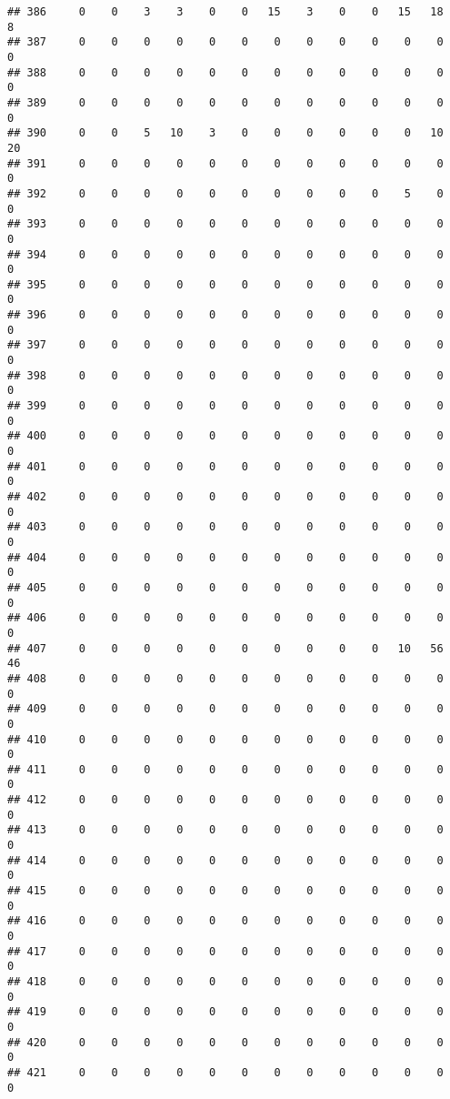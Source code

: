 \documentclass[]{article}
\begin{document}
\begin{verbatim}
## 386     0    0    3    3    0    0   15    3    0    0   15   18    8
## 387     0    0    0    0    0    0    0    0    0    0    0    0    0
## 388     0    0    0    0    0    0    0    0    0    0    0    0    0
## 389     0    0    0    0    0    0    0    0    0    0    0    0    0
## 390     0    0    5   10    3    0    0    0    0    0    0   10   20
## 391     0    0    0    0    0    0    0    0    0    0    0    0    0
## 392     0    0    0    0    0    0    0    0    0    0    5    0    0
## 393     0    0    0    0    0    0    0    0    0    0    0    0    0
## 394     0    0    0    0    0    0    0    0    0    0    0    0    0
## 395     0    0    0    0    0    0    0    0    0    0    0    0    0
## 396     0    0    0    0    0    0    0    0    0    0    0    0    0
## 397     0    0    0    0    0    0    0    0    0    0    0    0    0
## 398     0    0    0    0    0    0    0    0    0    0    0    0    0
## 399     0    0    0    0    0    0    0    0    0    0    0    0    0
## 400     0    0    0    0    0    0    0    0    0    0    0    0    0
## 401     0    0    0    0    0    0    0    0    0    0    0    0    0
## 402     0    0    0    0    0    0    0    0    0    0    0    0    0
## 403     0    0    0    0    0    0    0    0    0    0    0    0    0
## 404     0    0    0    0    0    0    0    0    0    0    0    0    0
## 405     0    0    0    0    0    0    0    0    0    0    0    0    0
## 406     0    0    0    0    0    0    0    0    0    0    0    0    0
## 407     0    0    0    0    0    0    0    0    0    0   10   56   46
## 408     0    0    0    0    0    0    0    0    0    0    0    0    0
## 409     0    0    0    0    0    0    0    0    0    0    0    0    0
## 410     0    0    0    0    0    0    0    0    0    0    0    0    0
## 411     0    0    0    0    0    0    0    0    0    0    0    0    0
## 412     0    0    0    0    0    0    0    0    0    0    0    0    0
## 413     0    0    0    0    0    0    0    0    0    0    0    0    0
## 414     0    0    0    0    0    0    0    0    0    0    0    0    0
## 415     0    0    0    0    0    0    0    0    0    0    0    0    0
## 416     0    0    0    0    0    0    0    0    0    0    0    0    0
## 417     0    0    0    0    0    0    0    0    0    0    0    0    0
## 418     0    0    0    0    0    0    0    0    0    0    0    0    0
## 419     0    0    0    0    0    0    0    0    0    0    0    0    0
## 420     0    0    0    0    0    0    0    0    0    0    0    0    0
## 421     0    0    0    0    0    0    0    0    0    0    0    0    0

\end{verbatim}
\end{document}
